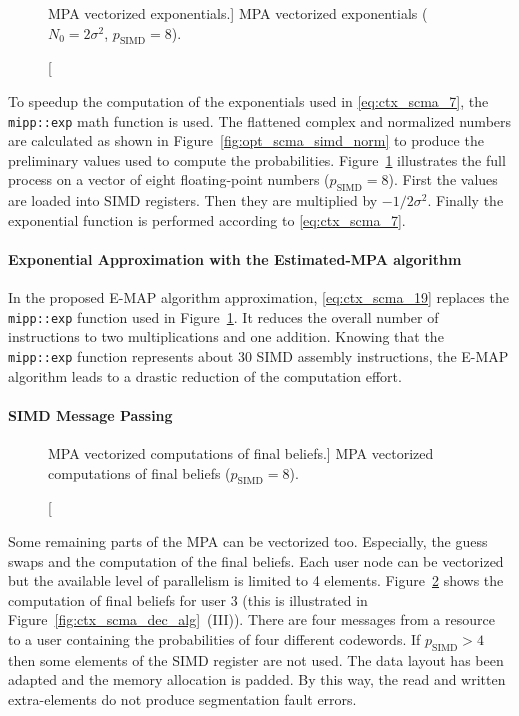 \begin{figure}[htp]
  \centering
  \caption
    [MPA vectorized exponentials.]
    {MPA vectorized exponentials ($N_0 = 2\sigma^2$, $p_\text{SIMD} = 8$).}
  \label{fig:opt_scma_simd_exp}
\end{figure}

To speedup the computation of the exponentials used in \eqref{eq:ctx_scma_7},
the \verb|mipp::exp| math function is used. The flattened complex and normalized
numbers are calculated as shown in Figure~\ref{fig:opt_scma_simd_norm} to
produce the preliminary values used to compute the probabilities.
Figure~\ref{fig:opt_scma_simd_exp} illustrates the full process on a vector of
eight floating-point numbers ($p_\text{SIMD} = 8$). First the values are loaded
into SIMD registers. Then they are multiplied by $-1/2\sigma^2$. Finally the
exponential function is performed according to \eqref{eq:ctx_scma_7}.

\paragraph{Exponential Approximation with the Estimated-MPA algorithm}

In the proposed E-MAP algorithm approximation, \eqref{eq:ctx_scma_19} replaces
the \verb|mipp::exp| function used in Figure~\ref{fig:opt_scma_simd_exp}. It
reduces the overall number of instructions to two multiplications and one
addition. Knowing that the \verb|mipp::exp| function represents about 30 SIMD
assembly instructions, the E-MAP algorithm leads to a drastic reduction of the
computation effort.

\paragraph{SIMD Message Passing}

\begin{figure}[htp]
  \centering
  \caption
    [MPA vectorized computations of final beliefs.]
    {MPA vectorized computations of final beliefs ($p_\text{SIMD} = 8$).}
  \label{fig:opt_scma_simd_final_guess}
\end{figure}

Some remaining parts of the MPA can be vectorized too. Especially, the guess
swaps and the computation of the final beliefs. Each user node can be
vectorized but the available level of parallelism is limited to 4 elements.
Figure~\ref{fig:opt_scma_simd_final_guess} shows the computation of final
beliefs for user 3 (this is illustrated in
Figure~\ref{fig:ctx_scma_dec_alg}~(III)). There are four messages from a
resource to a user containing the probabilities of four different codewords. If
$p_\text{SIMD} > 4$ then some elements of the SIMD register are not used. The
data layout has been adapted and the memory allocation is padded. By this way,
the read and written extra-elements do not produce segmentation fault errors.

